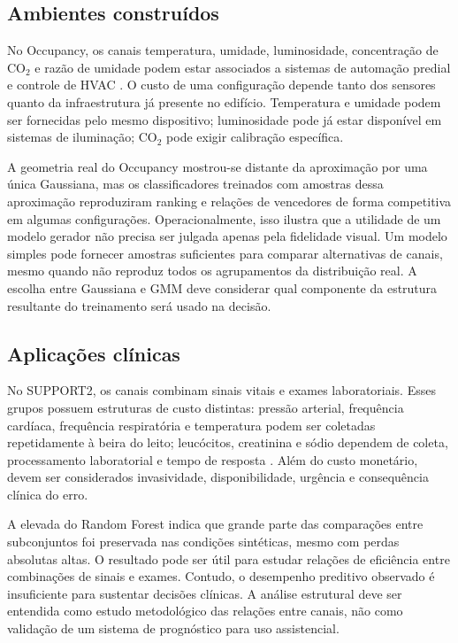 \subsection{Ambientes construídos}

No Occupancy, os canais temperatura, umidade, luminosidade, concentração de CO$_2$ e razão de umidade podem estar associados a sistemas de automação predial e controle de HVAC \cite{candanedo2016,Weber2020}. O custo de uma configuração depende tanto dos sensores quanto da infraestrutura já presente no edifício. Temperatura e umidade podem ser fornecidas pelo mesmo dispositivo; luminosidade pode já estar disponível em sistemas de iluminação; CO$_2$ pode exigir calibração específica.

A geometria real do Occupancy mostrou-se distante da aproximação por uma única Gaussiana, mas os classificadores treinados com amostras dessa aproximação reproduziram ranking e relações de vencedores de forma competitiva em algumas configurações. Operacionalmente, isso ilustra que a utilidade de um modelo gerador não precisa ser julgada apenas pela fidelidade visual. Um modelo simples pode fornecer amostras suficientes para comparar alternativas de canais, mesmo quando não reproduz todos os agrupamentos da distribuição real. A escolha entre Gaussiana e GMM deve considerar qual componente da estrutura resultante do treinamento será usado na decisão.

\subsection{Aplicações clínicas}

No SUPPORT2, os canais combinam sinais vitais e exames laboratoriais. Esses grupos possuem estruturas de custo distintas: pressão arterial, frequência cardíaca, frequência respiratória e temperatura podem ser coletadas repetidamente à beira do leito; leucócitos, creatinina e sódio dependem de coleta, processamento laboratorial e tempo de resposta \cite{support1995,knaus1995}. Além do custo monetário, devem ser considerados invasividade, disponibilidade, urgência e consequência clínica do erro.

A elevada \WinnersAgreement{} do Random Forest indica que grande parte das comparações entre subconjuntos foi preservada nas condições sintéticas, mesmo com perdas absolutas altas. O resultado pode ser útil para estudar relações de eficiência entre combinações de sinais e exames. Contudo, o desempenho preditivo observado é insuficiente para sustentar decisões clínicas. A análise estrutural deve ser entendida como estudo metodológico das relações entre canais, não como validação de um sistema de prognóstico para uso assistencial.

